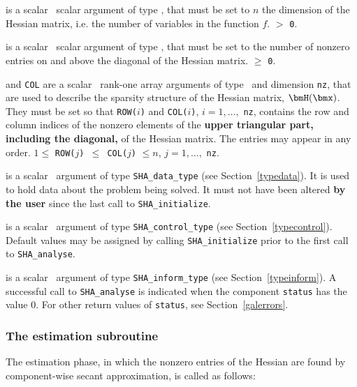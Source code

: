 \documentclass{galahad}
\newcommand{\packagename}{SHA}
\begin{document}
\vspace*{-2mm}
\begin{description}
is a scalar \intentin\ scalar argument of type \integer, that must be
set to $n$ the dimension of the Hessian matrix, i.e. the number of
variables in the function $f$.
 $>$ {\tt 0}.

is a scalar \intentin\ scalar argument of type \integer, that must be
set to the number of nonzero entries on and above the diagonal of the Hessian
matrix.
 $\ge$ {\tt 0}.

 and {\tt COL} are a scalar \intentin\ rank-one array arguments
of type  \integer\ and dimension {\tt nz}, that are used to describe
the sparsity structure of the Hessian matrix, $\bmH(\bmx)$.
They must be set so that
{\tt ROW(}$i${\tt)} and {\tt COL(}$i${\tt)}, $i = 1, \ldots,$ {\tt nz},
contains the row and column indices of the nonzero elements of the
{\bf upper triangular part, including the diagonal,} of the Hessian matrix.
The entries may appear in any order.
\restrictions
$1 \leq$ {\tt ROW(}$j${\tt) $\leq$ COL(}$j${\tt)} $\leq n$,
$j = 1, \ldots,$ {\tt nz}.

 is a scalar \intentinout\ argument of type
{\tt \packagename\_data\_type}
(see Section~\ref{typedata}). It is used to hold data about the problem being
solved. It must not have been altered {\bf by the user} since the last call to
{\tt \packagename\_initialize}.

 is a scalar \intentin\ argument of type
{\tt \packagename\_control\_type}
(see Section~\ref{typecontrol}). Default values may be assigned by calling
{\tt \packagename\_initialize} prior to the first call to
{\tt \packagename\_analyse}.

 is a scalar \intentinout\ argument of type
{\tt \packagename\_inform\_type}
(see Section~\ref{typeinform}).
A successful call to
{\tt \packagename\_analyse}
is indicated when the  component {\tt status} has the value 0.
For other return values of {\tt status}, see Section~\ref{galerrors}.

\end{description}


\subsubsection{The estimation subroutine}
The estimation phase, in which the nonzero entries of the Hessian
are found by component-wise secant approximation, is called as follows:
\vspace*{1mm}
\end{document}
